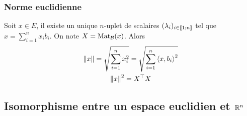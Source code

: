 \subsubsection{Norme euclidienne}

Soit $x \in E$, il existe un unique $n$-uplet de scalaires $(\lambda_i)_{i \in \mathopen{\llbracket}1\mathclose{}\mathpunct{};n\mathclose{\rrbracket}}$ tel que $x = \sum_{i=1}^n x_i b_i$. On note $X = \mathrm{Mat}_{\mathcal{B}}(x)$. Alors
\begin{gather}
  \left\lVert x\right\rVert = \sqrt{\sum_{i=1}^n x_i^2}=\sqrt{\sum_{i=1}^n \left\langle{x},{b_i}\right\rangle^2} \\
  \left\lVert x\right\rVert^2 = X^\top X
\end{gather}

\subsection{Isomorphisme entre un espace euclidien et $\mathbb{R}^n$}

